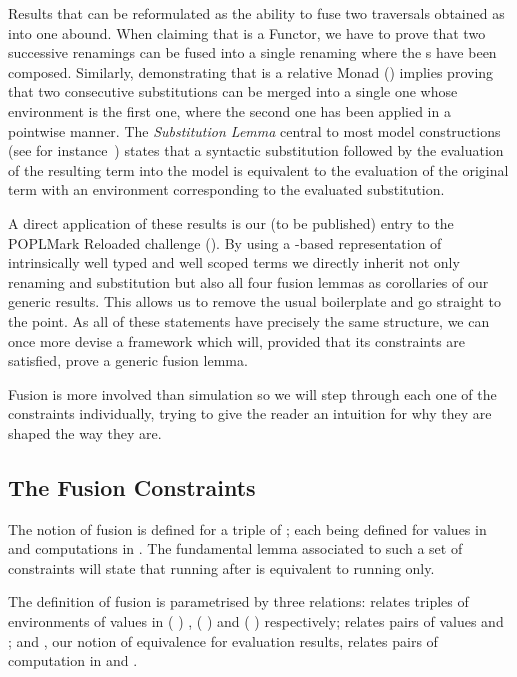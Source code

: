 Results that can be reformulated as the ability to fuse two traversals
obtained as  into one abound. When claiming that  is
a Functor, we have to prove that two successive renamings can be fused into
a single renaming where the s have been composed. Similarly,
demonstrating that  is a relative Monad (\cite{JFR4389}) implies proving
that two consecutive substitutions can be merged into a single one whose
environment is the first one, where the second one has been applied in a
pointwise manner. The \emph{Substitution Lemma} central
to most model constructions (see for instance~\cite{mitchell1991kripke}) states
that a syntactic substitution followed by the evaluation of the resulting term
into the model is equivalent to the evaluation of the original term with an
environment corresponding to the evaluated substitution.

A direct application of these results is our (to be published) entry to the
POPLMark Reloaded challenge (\citeyear{poplmarkreloaded}). By using a -based
representation of intrinsically well typed and well scoped terms we directly inherit
not only renaming and substitution but also all four fusion lemmas as corollaries
of our generic results. This allows us to remove the usual boilerplate
and go straight to the point.
As all of these statements have precisely the same structure, we can
once more devise a framework which will, provided that its constraints are
satisfied, prove a generic fusion lemma.

Fusion is more involved than simulation so we will step through
each one of the constraints individually, trying to give the reader an intuition
for why they are shaped the way they are.


\subsection{The Fusion Constraints}

The notion of fusion is defined for a triple of ; each 
being defined for values in  and computations in . The
fundamental lemma associated to such a set of constraints will state that
running  after  is equivalent to running  only.

The definition of fusion is parametrised by three relations:  relates
triples of environments of values in {( )  },
{( )  } and {( )  }
respectively;  relates pairs of values  and ;
and , our notion of equivalence for evaluation results, relates pairs
of computation in  and .

